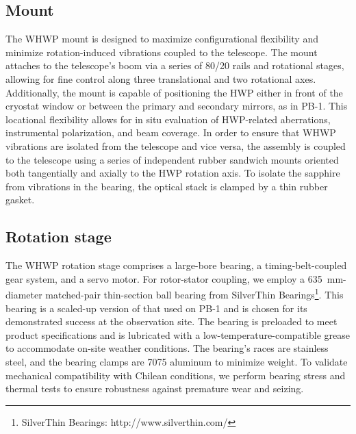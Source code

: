 
\subsection{Mount}
\label{sec:pb2a_whwp_mount}

The WHWP mount is designed to maximize configurational flexibility and minimize rotation-induced vibrations coupled to the telescope. The mount attaches to the telescope's boom via a series of 80/20 rails and rotational stages, allowing for fine control along three translational and two rotational axes. Additionally, the mount is capable of positioning the HWP either in front of the cryostat window or between the primary and secondary mirrors, as in PB-1. This locational flexibility allows for in situ evaluation of HWP-related aberrations, instrumental polarization, and beam coverage. In order to ensure that WHWP vibrations are isolated from the telescope and vice versa, the assembly is coupled to the telescope using a series of independent rubber sandwich mounts oriented both tangentially and axially to the HWP rotation axis. To isolate the sapphire from vibrations in the bearing, the optical stack is clamped by a thin rubber gasket.


\subsection{Rotation stage}
\label{sec:pb2a_whwp_rotation_stage}

The WHWP rotation stage comprises a large-bore bearing, a timing-belt-coupled gear system, and a servo motor. For rotor-stator coupling, we employ a 635~mm-diameter matched-pair thin-section ball bearing from SilverThin
Bearings\footnote{SilverThin Bearings: http://www.silverthin.com/}. This bearing is a scaled-up version of that used on PB-1 and is chosen for its demonstrated success at the observation site. The bearing is preloaded to meet product specifications and is lubricated with a low-temperature-compatible grease to accommodate on-site weather conditions. The bearing's races are stainless steel, and the bearing clamps are 7075 aluminum to minimize weight. To validate mechanical compatibility with Chilean conditions, we perform bearing stress and thermal tests to ensure robustness against premature wear and seizing. 

